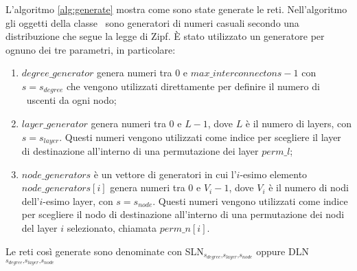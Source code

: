 L'algoritmo \vref{alg:generate} mostra come sono state generate le reti.
Nell'algoritmo gli oggetti della classe \tzgen\ sono generatori di numeri 
casuali secondo una distribuzione che segue la legge di Zipf. È stato utilizzato 
un generatore per ognuno dei tre parametri, in particolare:
\begin{enumerate}
    \item $degree\_generator$ genera numeri tra 0 e $max\_interconnectons - 1$
        con $s = s_{degree}$ che vengono utilizzati direttamente per definire il 
        numero di \interc\ uscenti da ogni nodo;
    \item $layer\_generator$ genera numeri tra 0 e $L - 1$, dove $L$ è il 
        numero di layers, con $s = s_{layer}$. Questi numeri vengono utilizzati 
        come indice per scegliere il layer di destinazione all'interno di una 
        permutazione dei layer $perm\_l$;
    \item $node\_generators$ è un vettore di generatori in cui 
        l'$i$-esimo elemento $node\_generators[i]$ genera numeri 
        tra 0 e $V_i - 1$, dove $V_i$ è il numero di nodi dell'$i$-esimo layer, 
        con $s = s_{node}$. Questi numeri vengono utilizzati 
        come indice per scegliere il nodo di destinazione all'interno 
        di una permutazione dei nodi del layer $i$ selezionato, 
        chiamata $perm\_n[i]$.
\end{enumerate}

Le reti così generate sono denominate con 
SLN{\Large$_{ s_{degree}\text{,}s_{layer}\text{,}s_{node}}$}
oppure
DLN{\Large$_{ s_{degree}\text{,}s_{layer}\text{,}s_{node}}$}



  
